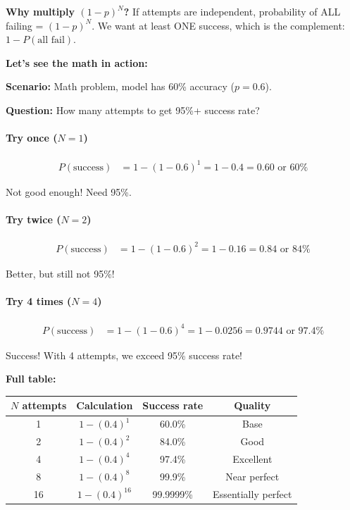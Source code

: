 \begin{chapterenv}
\begin{infobox}
\textbf{Why multiply $(1-p)^N$?} If attempts are independent, probability of ALL failing = $(1-p)^N$. We want at least ONE success, which is the complement: $1 - P(\text{all fail})$.
\end{infobox}

\textbf{Let's see the math in action:}

\textbf{Scenario:} Math problem, model has 60\% accuracy ($p = 0.6$).

\textbf{Question:} How many attempts to get 95\%+ success rate?

\paragraph{Try once ($N=1$)}

\begin{align*}
P(\text{success}) &= 1 - (1-0.6)^1 = 1 - 0.4 = 0.60 \text{ or } 60\%
\end{align*}

Not good enough! Need 95\%.

\paragraph{Try twice ($N=2$)}

\begin{align*}
P(\text{success}) &= 1 - (1-0.6)^2 = 1 - 0.16 = 0.84 \text{ or } 84\%
\end{align*}

Better, but still not 95\%!

\paragraph{Try 4 times ($N=4$)}

\begin{align*}
P(\text{success}) &= 1 - (1-0.6)^4 = 1 - 0.0256 = 0.9744 \text{ or } 97.4\%
\end{align*}

Success! With 4 attempts, we exceed 95\% success rate!

\textbf{Full table:}

\begin{center}
\begin{tabular}{cccc}
\toprule
\textbf{$N$ attempts} & \textbf{Calculation} & \textbf{Success rate} & \textbf{Quality} \\
\midrule
1 & $1 - (0.4)^1$ & 60.0\% & Base \\
2 & $1 - (0.4)^2$ & 84.0\% & Good \\
4 & $1 - (0.4)^4$ & 97.4\% & Excellent \\
8 & $1 - (0.4)^8$ & 99.9\% & Near perfect \\
16 & $1 - (0.4)^{16}$ & 99.9999\% & Essentially perfect \\
\bottomrule
\end{tabular}
\end{center}


\end{chapterenv}
